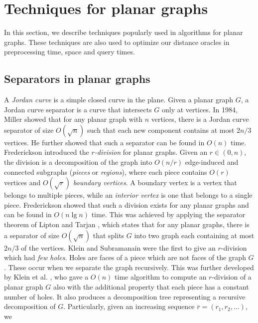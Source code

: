 \section{Techniques for planar graphs}\label{techniques}
In this section, we describe techniques popularly used in algorithms for planar graphs.
These techniques are also used to optimize our distance oracles in preprocessing time, space and
query times.

\subsection{Separators in planar graphs}\label{rdiv2}
A \textit{Jordan curve} is a simple closed curve in the plane. Given a planar graph $G$,
a Jordan curve separator is a curve that intersects $G$ only at vertices. In 1984, Miller
\cite{miller1984finding} showed that for any planar graph with $n$ vertices, there is a Jordan curve
separator of size $O(\sqrt{n})$ such that each new component contains at most $2n/3$
vertices. He further showed that such a separator can be found in $O(n)$ time. \\
Frederickson \cite{frederickson1987fast} introduced the \textit{$r$-division} for planar
graphs. Given an $r\in (0,n)$, the division is a decomposition of the graph into
$O(n/r)$ edge-induced and connected subgraphs (\textit{pieces} or \textit{regions}), where each piece contains $O(r)$ vertices and $O(\sqrt{r})$ \textit{boundary vertices}. A
boundary vertex is a vertex that belongs to multiple pieces, while an \textit{interior
vertex} is one that belongs to a single piece. Frederickson showed that
such a division exists for any planar graphs and can be found in $O(n\lg n)$ time. This
was achieved by applying the separator theorem of Lipton and Tarjan
\cite{lipton1979separator}, which states that for any planar graphs, there is a separator
of size $O(\sqrt{n})$ that splits $G$ into two graph each containing at most $2n/3$ of
the vertices. Klein and Subramanain \cite{klein1998fully} were the first to give an
$r$-division which had \textit{few holes}. Holes are faces of a piece which are not faces
of the graph $G$. These occur when we separate the graph recursively. This was further developed
by Klein et al. \cite{klein2013structured}, who gave a $O(n)$ time algorithm to compute
an $r$-division of a planar graph $G$ also with the additional property that each piece has a
constant number of holes. It also produces a decomposition tree representing a recursive
decomposition of $G$. Particularly, given an increasing sequence $\overline{r}=(r_1,r_2,\dots)$, we

